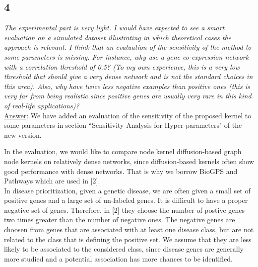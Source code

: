 \documentclass[11pt]{article}
\begin{document}
\subsection*{4} \textit{The experimental part is very light. I would have expected to see a smart evaluation on a simulated dataset illustrating in which theoretical cases the approach is relevant. I think that an evaluation of the sensitivity of the method to some parameters is missing. For instance, why use a gene co-expression network with a correlation threshold of 0.5? (To my own experience, this is a very low threshold that should give a very dense network and is not the standard choices in this area). Also, why have twice less negative examples than positive ones (this is very far from being realistic since positive genes are usually very rare in this kind of real-life applications)?} \\

\underline{Answer}: We have added an evaluation of the sensitivity of the proposed kernel to some parameters in section ``Sensitivity Analysis for Hyper-parameters" of the new version.

In the evaluation, we would like to compare node kernel diffusion-based graph node kernels on relatively dense networks, since diffusion-based kernels often show good performance with dense networks. That is why we borrow BioGPS and Pathways which are used in [2]. \\

In disease prioritization, given a genetic disease, we are often given a small set of positive genes and a large set of un-labeled genes. It is difficult to have a proper negative set of genes. Therefore, in [2] they choose the number of postive genes two times greater than the number of negative ones. The negative genes are choosen from genes that are associated with at least one disease class, but are not related to the class that is defining the positive set. We assume that they are less likely to be associated to the considered class, since disease genes are generally more studied and a potential association has more chances to be identified.
\end{document}
